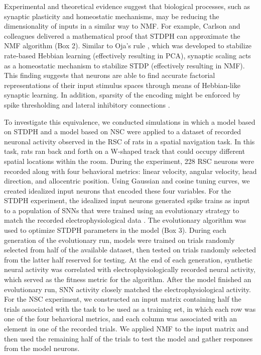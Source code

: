 Experimental and theoretical evidence suggest that biological processes, such as synaptic plasticity and homeostatic mechanisms, may be reducing the dimensionality of inputs in a similar way to NMF. For example, Carlson and colleagues \citep{Carlson2013} delivered a mathematical proof
that \ac{STDPH} can approximate the \ac{NMF} algorithm (Box 2).
Similar to Oja's rule \citep{Oja1982}, which was developed to stabilize 
rate-based Hebbian learning
(effectively resulting in \ac{PCA}),
synaptic scaling acts as a homeostatic mechanism to stabilize \ac{STDP}
(effectively resulting in \ac{NMF}).
This finding suggests that neurons are able to find accurate factorial
representations of their input stimulus spaces through means of Hebbian-like
synaptic learning. In addition, sparsity of the encoding might be enforced by spike thresholding \citep{Rozell2008}
and lateral inhibitory connections \citep{Coultrip1992}.

To investigate this equivalence, we conducted simulations in which a model based on \ac{STDPH} and a model based on \ac{NSC} were applied to a dataset of recorded neuronal activity observed in the \ac{RSC} of rats in a spatial navigation task. In this task, rats ran back and forth on a W-shaped track that could occupy different spatial locations within the room. During the experiment, 228 \ac{RSC} neurons  were recorded along with four behavioral metrics: linear velocity, angular velocity, head direction, and allocentric position. Using Gaussian and cosine tuning curves, we created idealized input neurons that encoded these four variables. For the \ac{STDPH} experiment, the idealized input neurons generated spike trains as input to a population of SNNs that were trained using an evolutionary strategy to match the recorded electrophysiological data \citep{Rounds2016}. The evolutionary algorithm was used to optimize STDPH parameters in the model (Box 3).    During each generation of the evolutionary run, models were trained on trials randomly selected from half of the available dataset, then tested on trials randomly selected from the latter half reserved for testing. At the end of each generation, synthetic neural activity was correlated with electrophysiologically recorded neural activity, which served as the fitness metric for the algorithm. After the model finished an evolutionary run, SNN activity closely matched the electrophysiological activity. For the \ac{NSC} experiment, we constructed an input matrix containing half the trials associated with the task to be used as a training set, in which each row was one of the four behavioral metrics, and each column was associated with an element in one of the recorded trials. We applied \ac{NMF} to the input matrix and then used the remaining half of the trials to test the model and gather responses from the model neurons.

